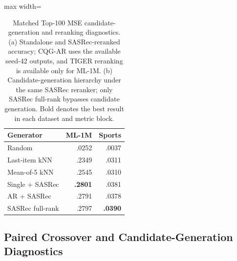 \documentclass[preprint,12pt]{elsarticle}
\begin{document}
\begin{table}[htbp]
\begin{minipage}[t]{0.36\textwidth}
\begin{adjustbox}{max width=\linewidth}
\begin{tabular}{lrr}
\toprule
Generator & ML-1M & Sports \\
\midrule
Random & .0252 & .0037 \\
Last-item kNN & .2349 & .0311 \\
Mean-of-5 kNN & .2545 & .0310 \\
Single + SASRec & \textbf{.2801} & .0381 \\
AR + SASRec & .2791 & .0378 \\
SASRec full-rank & .2797 & \textbf{.0390} \\
\bottomrule
\end{tabular}
\end{adjustbox}
\end{minipage}
\caption{Matched Top-100 MSE candidate-generation and reranking diagnostics.
(a) Standalone and SASRec-reranked accuracy; CQG-AR uses the available
seed-42 outputs, and TIGER reranking is available only for ML-1M.
(b) Candidate-generation hierarchy under the same SASRec reranker; only
SASRec full-rank bypasses candidate generation. Bold denotes the best result
in each dataset and metric block.}
\label{tab:mse-rerank}
\label{tab:retrieval-hierarchy}
\end{table}


\subsection{Paired Crossover and Candidate-Generation Diagnostics}
\label{app:crossover-values}
\end{document}
